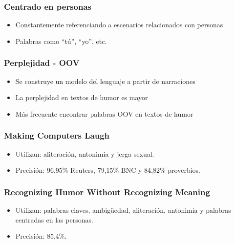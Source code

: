\begin{frame}
\frametitle{Centrado en personas}
    \begin{itemize}
        \item Constantemente referenciando a escenarios relacionados con personas
        \item Palabras como “tú”, “yo”, etc.
    \end{itemize}
\end{frame}

\begin{frame}
\frametitle{Perplejidad - OOV}
    \begin{itemize}
        \item Se construye un modelo del lenguaje a partir de narraciones
        \item La perplejidad en textos de humor es mayor
        \item Más frecuente encontrar palabras OOV en textos de humor
    \end{itemize}
\end{frame}

\begin{frame}
\frametitle{Making Computers Laugh}
    \begin{itemize}
        \item Utilizan: aliteración, antonimia y jerga sexual.
        \item Precisión: 96,95\% Reuters, 79,15\% BNC y 84,82\% proverbios.
    \end{itemize}
\end{frame}

\begin{frame}
\frametitle{Recognizing Humor Without Recognizing Meaning}
    \begin{itemize}
        \item Utilizan: palabras claves, ambigüedad, aliteración, antonimia y palabras centradas en las personas.
        \item Precisión: 85,4\%.
    \end{itemize}
\end{frame}
